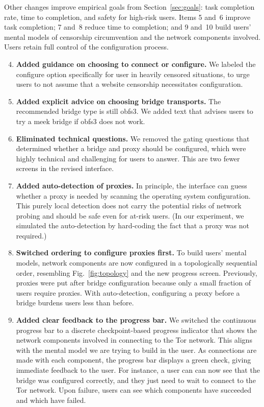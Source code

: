 \documentclass[USenglish,oneside,twocolumn]{article}
\begin{document}
Other changes improve empirical goals from Section~\ref{sec:goals}: task completion rate, time to completion, and safety for high-risk users. Items 5 and~6 improve task completion; 7 and~8 reduce time to completion; and 9 and~10 build users' mental models of censorship circumvention and the network components involved. Users retain full control of the configuration process.\\ 

\begin{enumerate}
\setcounter{enumi}{3}
\item {\bfseries Added guidance on choosing to connect or configure.} We labeled the configure option specifically for user in heavily censored situations, to urge users to not assume that a website censorship necessitates configuration.
\item {\bfseries Added explicit advice on choosing bridge transports.} The recommended bridge type is still obfs3. We added text that advises users to try a meek bridge if obfs3 does not work. 

\item {\bfseries Eliminated technical questions.}  We removed the gating questions that determined whether a bridge and proxy should be configured, which were highly technical and challenging for users to answer. This are two fewer screens in the revised interface. 
\item {\bfseries Added auto-detection of proxies.} In principle, the interface can guess whether a proxy is needed by scanning the operating system configuration. This purely local detection does not carry the potential risks of network probing and should be safe even for at-risk users. (In our experiment, we simulated the auto-detection by hard-coding the fact that a proxy was not required.)

\item {\bfseries Switched ordering to configure proxies first.} To build users' mental models, network components are now configured in a topologically sequential order, resembling Fig.~\ref{fig:topology} and the new progress screen. Previously, proxies were put after bridge configuration because only a small fraction of users require proxies. With auto-detection, configuring a proxy before a bridge burdens users less than before.
\item {\bfseries Added clear feedback to the progress bar.} We switched the continuous progress bar to a discrete checkpoint-based progress indicator that shows the network components involved in connecting to the Tor network. This aligns with the mental model we are trying to build in the user. As connections are made with each component, the progress bar displays a green check, giving immediate feedback to the user. For instance, a user can can now see that the bridge was configured correctly, and they just need to wait to connect to the Tor network. Upon failure, users can see which components have succeeded and which have failed.
\end{enumerate}
\end{document}
